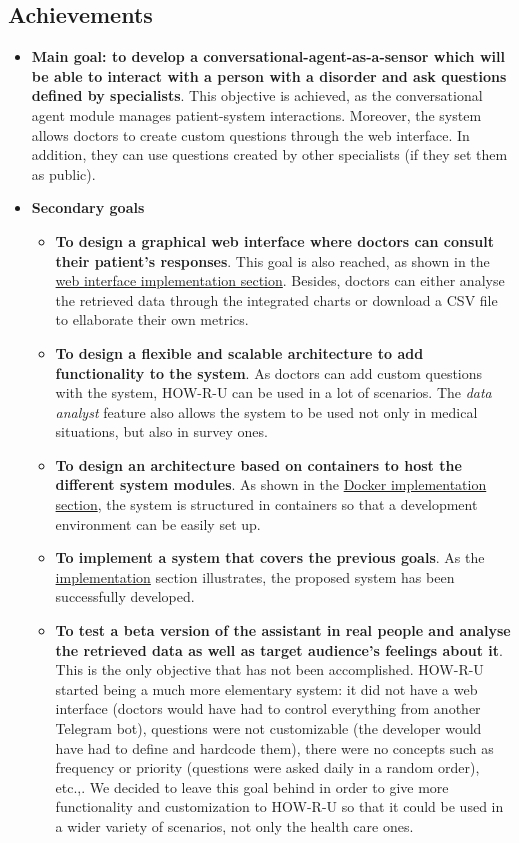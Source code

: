 \documentclass[12pt,english]{article}
\begin{document}
\subsection{Achievements}

\begin{itemize}
  \item \textbf{Main goal: to develop a conversational-agent-as-a-sensor which will be able to interact with a person with a disorder and ask questions defined by specialists}. This objective is achieved, as the conversational agent module manages patient-system interactions. Moreover, the system allows doctors to create custom questions through the web interface. In addition, they can use questions created by other specialists (if they set them as public).
  \item \textbf{Secondary goals}
  \begin{itemize}
    \item \textbf{To design a graphical web interface where doctors can consult their patient’s responses}. This goal is also reached, as shown in the \hyperref[sec:web_int]{web interface implementation section}. Besides, doctors can either analyse the retrieved data through the integrated charts or download a CSV file to ellaborate their own metrics.
    \item \textbf{To design a flexible and scalable architecture to add functionality to the system}. As doctors can add custom questions with the system, HOW-R-U can be used in a lot of scenarios. The \emph{data analyst} feature also allows the system to be used not only in medical situations, but also in survey ones.
    \item \textbf{To design an architecture based on containers to host the different system modules}. As shown in the \hyperref[sec:docker]{Docker implementation section}, the system is structured in containers so that a development environment can be easily set up.
    \item \textbf{To implement a system that covers the previous goals}. As the \hyperref[sec:implementation]{implementation} section illustrates, the proposed system has been successfully developed.
    \item \textbf{To test a beta version of the assistant in real people and analyse the retrieved data as well as target audience’s feelings about it}. This is the only objective that has not been accomplished. HOW-R-U started being a much more elementary system: it did not have a web interface (doctors would have had to control everything from another Telegram bot), questions were not customizable (the developer would have had to define and hardcode them), there were no concepts such as frequency or priority (questions were asked daily in a random order), etc.,.
    We decided to leave this goal behind in order to give more functionality and customization to HOW-R-U so that it could be used in a wider variety of scenarios, not only the health care ones.
  \end{itemize}
\end{itemize}
\newpage
\end{document}
